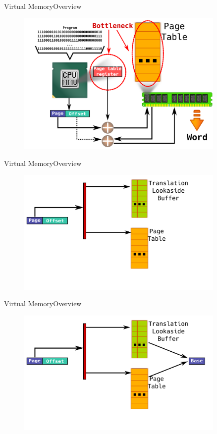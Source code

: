 \documentclass[10pt]{beamer}
\begin{document}
\begin{frame}{Virtual Memory}{Overview}
  \begin{figure}[ht]
    \centering
    \includegraphics[width=0.9\textwidth, keepaspectratio=true]{images/tlb_a.png}
  \end{figure}
\end{frame}

\begin{frame}{Virtual Memory}{Overview}
  \begin{figure}[ht]
    \centering
    \includegraphics[width=0.9\textwidth, keepaspectratio=true]{images/tlb_b.png}
  \end{figure}
\end{frame}

\begin{frame}{Virtual Memory}{Overview}
  \begin{figure}[ht]
    \centering
    \includegraphics[width=0.9\textwidth, keepaspectratio=true]{images/tlb_c.png}
  \end{figure}
\end{frame}
\end{document}
